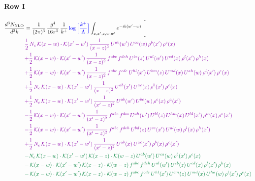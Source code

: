\documentclass[10pt]{article}
\numberwithin{equation}{section}
\newcommand{\new}[1]{{\color{blue}#1}}
\begin{document}
\paragraph{Row I}
\begin{align}
\frac{d^{3}N_{\mathrm{NLO}}}{d^{3}k} & = \frac{1}{(2\pi)^{3}}\,\frac{g^{4}}{16\pi^{5}}\,\frac{1}{k^{+}}\,\new{\log\Big[\frac{k^{+}}{\Lambda}\Big]}\int_{x,x',z,w,w'}e^{-ik(w'-w)}\,\Bigg[\notag\\ &{\color{CC} \frac{1}{2}\,N_{c}\,\mathcal{K}(x-w)\cdot\mathcal{K}(x'-w')\,\frac{1}{(x-z)^{2}}\,U^{ab}(w')\,U^{ca}(w)\,\rho^{b}(x')\,\rho^{c}(x)} \notag\\
&{\color{CC} +\frac{1}{2}\,\mathcal{K}(x-w)\cdot\mathcal{K}(x'-w')\,\frac{1}{(x-z)^{2}}\,f^{abc}\,f^{deh}\,U^{be}(z)\,U^{al}(w')\,U^{cd}(x)\,\rho^{l}(x')\,\rho^{h}(x)} \notag\\
&{\color{CC} +\frac{1}{2}\,\mathcal{K}(x-w)\cdot\mathcal{K}(x'-w')\,\frac{1}{(x-z)^{2}}\,f^{abc}\,f^{cde}\,U^{hl}(x')\,U^{bm}(z)\,U^{md}(x)\,U^{ah}(w)\,\rho^{l}(x')\,\rho^{e}(x)} \notag\\
&{\color{CC} +\frac{1}{2}\,N_{c}\,\mathcal{K}(x-w)\cdot\mathcal{K}(x'-w')\,\frac{1}{(x-z)^{2}}\,U^{ab}(x')\,U^{ac}(x)\,\rho^{b}(x')\,\rho^{c}(x)} \notag\\
&{\color{CC} +\frac{1}{2}\,N_{c}\,\mathcal{K}(x-w)\cdot\mathcal{K}(x'-w')\,\frac{1}{(x'-z)^{2}}\,U^{ab}(w')\,U^{bc}(w)\,\rho^{c}(x)\,\rho^{a}(x')} \notag\\
&{\color{CC} -\frac{1}{2}\,\mathcal{K}(x-w)\cdot\mathcal{K}(x'-w')\,\frac{1}{(x'-z)^{2}}\,f^{abc}\,f^{dce}\,U^{ah}(w')\,U^{bl}(z)\,U^{hm}(x)\,U^{ld}(x')\,\rho^{m}(x)\,\rho^{e}(x')} \notag\\
&{\color{CC} -\frac{1}{2}\,\mathcal{K}(x-w)\cdot\mathcal{K}(x'-w')\,\frac{1}{(x'-z)^{2}}\,f^{abc}\,f^{deh}\,U^{bd}(z)\,U^{ce}(x')\,U^{al}(w)\,\rho^{l}(x)\,\rho^{h}(x')} \notag\\
&{\color{CC} +\frac{1}{2}\,N_{c}\,\mathcal{K}(x-w)\cdot\mathcal{K}(x'-w')\,\frac{1}{(x'-z)^{2}}\,U^{ab}(x)\,U^{ac}(x')\,\rho^{b}(x)\,\rho^{c}(x')} \notag\\
&{\color{JIM} -N_{c}\,\mathcal{K}(x-w)\cdot\mathcal{K}(x'-w')\,\mathcal{K}(x-z)\cdot\mathcal{K}(w-z)\,U^{ab}(w')\,U^{ca}(w)\,\rho^{b}(x')\,\rho^{c}(x)} \notag\\
&{\color{JIM} -\,\mathcal{K}(x-w)\cdot\mathcal{K}(x'-w')\,\mathcal{K}(x-z)\cdot\mathcal{K}(w-z)\,f^{abc}\,f^{deh}\,U^{al}(w')\,U^{eb}(z)\,U^{cd}(x)\,\rho^{l}(x')\,\rho^{h}(x)} \notag\\
&{\color{JIM} -\,\mathcal{K}(x-w)\cdot\mathcal{K}(x'-w')\,\mathcal{K}(x-z)\cdot\mathcal{K}(w-z)\,f^{abc}\,f^{cde}\,U^{hl}(x')\,U^{bm}(z)\,U^{md}(x)\,U^{ha}(w)\,\rho^{l}(x')\,\rho^{e}(x)} \notag\\

\end{align}
\end{document}

